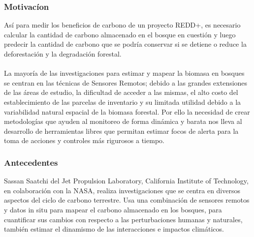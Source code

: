 \documentclass[xcolor=table]{beamer}
\begin{document}
\begin{frame}
	\frametitle{Motivac\'ion}
As\'i para medir los beneficios de carbono de un proyecto REDD+, es necesario calcular la cantidad de carbono almacenado en el bosque en cuesti\'on y luego predecir la cantidad de carbono que se podr\'ia conservar si se detiene o reduce la deforestaci\'on y la degradaci\'on forestal.\\~\\
	
La mayor\'ia de las investigaciones para estimar y mapear la biomasa en bosques se centran en las t\'ecnicas de Sensores Remotos; debido a las grandes extensiones de las \'areas de estudio, la dificultad de acceder a las mismas, el alto costo del establecimiento de las parcelas de inventario y su limitada utilidad debido a la variabilidad natural espacial de la biomasa forestal. Por ello la necesidad de crear metodolog\'ias que ayuden al monitoreo de forma din\'amica y barata nos lleva al desarrollo de herramientas libres que permitan estimar focos de alerta para la toma de acciones y controles m\'as rigurosos a tiempo.
	
	
\end{frame}



\begin{frame}
	\frametitle{Antecedentes}
	Sassan Saatchi del Jet Propulsion Laboratory, California Institute of Technology, en colaboraci\'on con la NASA, realiza investigaciones que se centra en diversos aspectos del ciclo de carbono terrestre. Usa una combinaci\'on de sensores remotos y datos in situ para mapear el carbono almacenado en los bosques, para cuantificar sus cambios con respecto a las perturbaciones humanas y naturales, tambi\'en estimar el dinamismo de las interacciones e impactos clim\'aticos. 
	
	
\end{frame}

\end{document}
